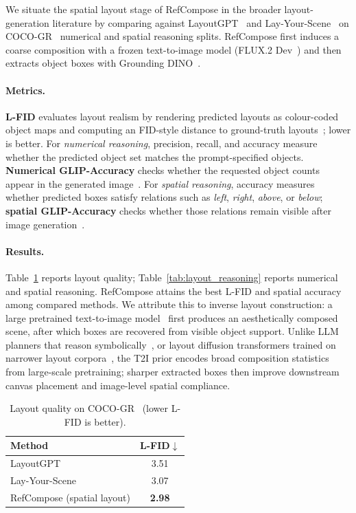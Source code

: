 We situate the spatial layout stage of RefCompose in the broader layout-generation literature by comparing against LayoutGPT~\cite{feng2023layoutgpt} and Lay-Your-Scene~\cite{srivastava2025layyourscene} on COCO-GR~\cite{feng2023layoutgpt} numerical and spatial reasoning splits.
RefCompose first induces a coarse composition with a frozen text-to-image model (FLUX.2 Dev~\cite{blackforestlabs2026flux2dev}) and then extracts object boxes with Grounding DINO~\cite{liu2023grounding}.

\paragraph{Metrics.}
\textbf{L-FID} evaluates layout realism by rendering predicted layouts as colour-coded object maps and computing an FID-style distance to ground-truth layouts~\cite{heusel2017fid}; lower is better.
For \emph{numerical reasoning}, precision, recall, and accuracy measure whether the predicted object set matches the prompt-specified objects.
\textbf{Numerical GLIP-Accuracy} checks whether the requested object counts appear in the generated image~\cite{li2022glip}.
For \emph{spatial reasoning}, accuracy measures whether predicted boxes satisfy relations such as \emph{left}, \emph{right}, \emph{above}, or \emph{below}; \textbf{spatial GLIP-Accuracy} checks whether those relations remain visible after image generation~\cite{li2022glip}.

\paragraph{Results.}
Table~\ref{tab:layout_lfid} reports layout quality; Table~\ref{tab:layout_reasoning} reports numerical and spatial reasoning.
RefCompose attains the best L-FID and spatial accuracy among compared methods.
We attribute this to inverse layout construction: a large pretrained text-to-image model~\cite{blackforestlabs2026flux2dev} first produces an aesthetically composed scene, after which boxes are recovered from visible object support.
Unlike LLM planners that reason symbolically~\cite{feng2023layoutgpt}, or layout diffusion transformers trained on narrower layout corpora~\cite{srivastava2025layyourscene}, the T2I prior encodes broad composition statistics from large-scale pretraining; sharper extracted boxes then improve downstream canvas placement and image-level spatial compliance.

\begin{table}[t]
  \centering
  \caption{Layout quality on COCO-GR~\cite{feng2023layoutgpt} (lower L-FID is better).}
  \label{tab:layout_lfid}
  \setlength{\tabcolsep}{8pt}
  \begin{tabular}{lc}
    \toprule
    \textbf{Method} & \textbf{L-FID}$\downarrow$ \\
    \midrule
    LayoutGPT~\cite{feng2023layoutgpt} & 3.51 \\
    Lay-Your-Scene~\cite{srivastava2025layyourscene} & 3.07 \\
    RefCompose (spatial layout) & \textbf{2.98} \\
    \bottomrule
  \end{tabular}
\end{table}

